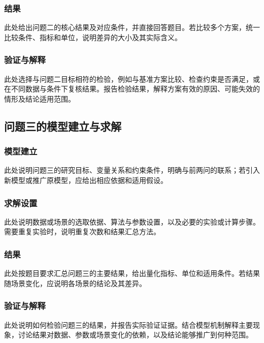 \subsubsection{结果}
此处给出问题二的核心结果及对应条件，并直接回答题目。若比较多个方案，统一比较条件、指标和单位，说明差异的大小及其实际含义。

\subsubsection{验证与解释}
此处选择与问题二目标相符的检验，例如与基准方案比较、检查约束是否满足，或在不同数据与条件下复核结果。报告检验结果，解释方案有效的原因、可能失效的情形及结论适用范围。

\subsection{问题三的模型建立与求解}
\subsubsection{模型建立}
此处说明问题三的研究目标、变量关系和约束条件，明确与前两问的联系；若引入新模型或推广原模型，应给出相应依据和适用假设。

\subsubsection{求解设置}
此处说明数据或场景的选取依据、算法与参数设置，以及必要的实验或计算步骤。需要重复实验时，说明重复次数和结果汇总方法。

\subsubsection{结果}
此处按题目要求汇总问题三的主要结果，给出量化指标、单位和适用条件。若结果随场景变化，应说明各场景的结论及其差异。

\subsubsection{验证与解释}
此处说明如何检验问题三的结果，并报告实际验证证据。结合模型机制解释主要现象，讨论结果对数据、参数或场景变化的依赖，以及结论能够推广到何种范围。
